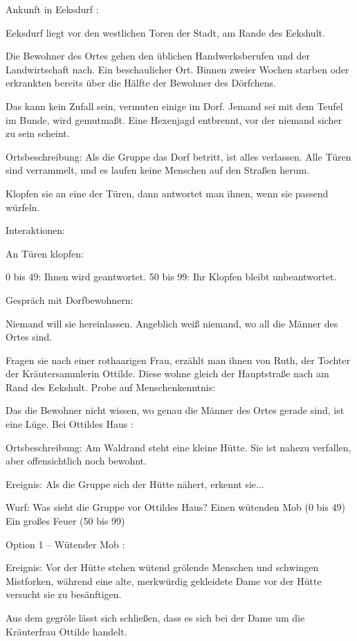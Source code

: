 Ankunft in Eeksdurf
:

Eeksdurf liegt vor den westlichen Toren der Stadt, am Rande des Eekshult.

Die Bewohner des Ortes gehen den üblichen Handwerksberufen und der Landwirtschaft nach. Ein beschaulicher Ort. Binnen zweier Wochen starben oder erkrankten bereits über die Hälfte der Bewohner des Dörfchens.

Das kann kein Zufall sein, vermuten einige im Dorf. Jemand sei mit dem Teufel im Bunde, wird gemutmaßt. Eine Hexenjagd entbrennt, vor der niemand sicher zu sein scheint.

Ortsbeschreibung: Als die Gruppe das Dorf betritt, ist alles verlassen. Alle Türen sind verrammelt, und es laufen keine Menschen auf den Straßen herum.

Klopfen sie an eine der Türen, dann antwortet man ihnen, wenn sie passend würfeln.

Interaktionen:

An Türen klopfen:

0 bis 49: Ihnen wird geantwortet.
50 bis 99: Ihr Klopfen bleibt unbeantwortet.

Gespräch mit Dorfbewohnern:

Niemand will sie hereinlassen.
Angeblich weiß niemand, wo all die Männer des Ortes sind.

Fragen sie nach einer rothaarigen Frau, erzählt man ihnen von Ruth, der Tochter der Kräutersammlerin Ottilde.
Diese wohne gleich der Hauptstraße nach am Rand des Eekshult.
Probe auf Menschenkenntnis:

Das die Bewohner nicht wissen, wo genau die Männer des Ortes gerade sind, ist eine Lüge.
Bei Ottildes Haus
:

Ortsbeschreibung: Am Waldrand steht eine kleine Hütte. Sie ist nahezu verfallen, aber offensichtlich noch bewohnt.

Ereignis: Als die Gruppe sich der Hütte nähert, erkennt sie...

Wurf: Was sieht die Gruppe vor Ottildes Haus?
Einen wütenden Mob (0 bis 49)
Ein großes Feuer (50 bis 99)

Option 1 – Wütender Mob
:

Ereignis: Vor der Hütte stehen wütend grölende Menschen und schwingen Mistforken, während eine alte, merkwürdig gekleidete Dame vor der Hütte versucht sie zu besänftigen.

Aus dem gegröle lässt sich schließen, dass es sich bei der Dame um die Kräuterfrau Ottilde handelt.

